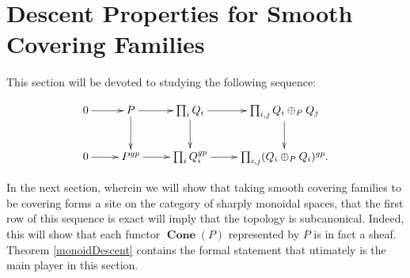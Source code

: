 \documentclass[12pt]{amsart}
\numberwithin{equation}{section}
\theoremstyle{plain}
\theoremstyle{remark}
\DeclareMathOperator{\Cone}{\textbf{Cone}}
\begin{document}
\section{Descent Properties for Smooth Covering Families}
This section will be devoted to studying the following sequence:
\begin{center}
\begin{equation}\label{sheafDescent}
	$$\xymatrix{
		0\ar[r] & P\ar[r] \ar[d] & \prod_i Q_i\ar[r]\ar[d] & \prod_{i,j}Q_i\oplus_P Q_j \ar[d]\\
		0\ar[r] & P^{gp}\ar[r] & \prod_iQ_i^{gp}\ar[r] & \prod_{i,j}(Q_i\oplus_P Q_i)^{gp}.\\
	}$$
\end{equation}
\end{center}
In the next section, wherein we will show that taking smooth covering families to be covering forms a site on the category of sharply monoidal spaces, that the first row of this sequence is exact will imply that the topology is subcanonical. Indeed, this will show that each functor $\Cone(P)$ represented by $P$ is in fact a sheaf. Theorem \eqref{monoidDescent} contains the formal statement that utimately is the main player in this section.
\end{document}
